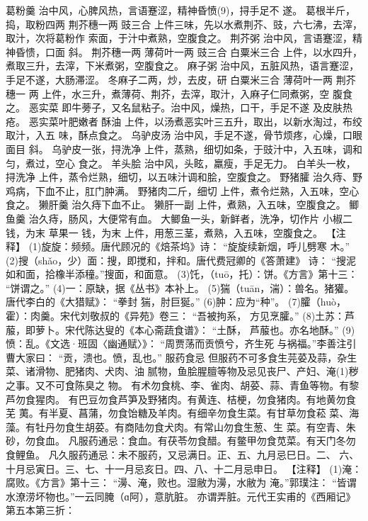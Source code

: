 \documentclass[12pt,UTF8]{ctexbook}
\begin{document}
葛粉羹 治中风，心脾风热，言语蹇涩，精神昏愤(9)，挦手足不
遂。
葛根半斤，捣，取粉四两 荆芥穗一两 豉三合
上件三味，先以水煮荆芥、豉，六七沸，去滓，取汁，次将葛粉作
索面，于汁中煮熟，空腹食之。
荆芥粥 治中风，言语蹇涩，精神昏愦，口面 斜。
荆芥穗一两 薄荷叶一两 豉三合 白粟米三合
上件，以水四升，煮取三升，去滓，下米煮粥，空腹食之。
麻子粥 治中风，五脏风热，语言蹇涩，手足不遂，大肠滞涩。
冬麻子二两，炒，去皮，研 白粟米三合 薄荷叶一两 荆芥穗一
两
上件，水三升，煮薄荷、荆芥，去滓，取汁，入麻子仁同煮粥，空
腹食之。
恶实菜 即牛蒡子，又名鼠粘子。治中风，燥热，口干，手足不遂
及皮肤热疮。
恶实菜叶肥嫩者 酥油
上件，以汤煮恶实叶三五升，取出，以新水淘过，布绞取汁，入五
味，酥点食之。
乌驴皮汤 治中风，手足不遂，骨节烦疼，心燥，口眼面目 斜。
乌驴皮一张，挦洗净
上件，蒸熟，细切如条，于豉汁中，入五味，调和匀，煮过，空心
食之。
羊头脍 治中风，头眩，羸瘦，手足无力。
白羊头一枚，挦洗净
上件，蒸令烂熟，细切，以五味汁调和脍，空腹食之。
野猪臛 治久痔、野鸡病，下血不止，肛门肿满。
野猪肉二斤，细切
上件，煮令烂熟，入五味，空心食之。
獭肝羹 治久痔下血不止。
獭肝一副
上件，煮熟，入五味，空腹食之。
鲫鱼羹 治久痔，肠风，大便常有血。
大鲫鱼一头，新鲜者，洗净，切作片 小椒二钱，为末 草果一
钱，为末
上件，用葱三茎，煮熟，入五味，空腹食之。
【注释】
(1)旋旋：频频。唐代顾况的《焙茶坞》诗：
“旋旋续新烟，呼儿劈寒
木。”
(2)搜（shǎo，少）面：搜，即搅和，拌和。唐代费冠卿的《答萧建》
诗：
“搜泥如和面，拾橡半添穜。”搜面，和面意。
(3)饦，（tuō，托）：饼。《方言》第十三：
“饼谓之。”
(4)一：原缺，据《丛书》本补上。
(5)猯（tuān，湍）：兽名。猪獾。唐代李白的《大猎赋》：
“拳封
猯，肘巨狿。”
(6)肿：应为“种”。
(7)臛（huò，霍）：肉羹。宋代刘敬叔的《异苑》卷三：
“吾被拘系，
方见烹臛。”
(8)土苏：芦菔，即萝卜。宋代陈达叟的《本心斋蔬食谱》：
“土酥，
芦菔也。亦名地酥。”
(9)愤：乱。《文选·班固〈幽通赋〉》：
“周贾荡而贡愤兮，齐生死
与祸福。”李善注引曹大家曰：
“贡，溃也。愤，乱也。”
服药食忌
但服药不可多食生芫荽及蒜，杂生菜、诸滑物、肥猪肉、犬肉、油
腻物，鱼脍腥膻等物及忌见丧尸、产妇、淹(1)秽之事。又不可食陈臭之
物。
有术勿食桃、李、雀肉、胡荽、蒜、青鱼等物。有黎芦勿食猩肉。
有巴豆勿食芦笋及野猪肉。有黄连、桔梗，勿食猪肉。有地黄勿食芜
荑。有半夏、菖蒲，勿食饴糖及羊肉。有细辛勿食生菜。有甘草勿食菘
菜、海藻。有牡丹勿食生胡荽。有商陆勿食犬肉。有常山勿食生葱、生
菜。有空青、朱砂，勿食血。
凡服药通忌：食血。有茯苓勿食醋。有鳖甲勿食苋菜。有天门冬勿
食鲤鱼。
凡久服药通忌：未不服药，又忌满日。正、五、九月忌巳日。二、
六、十月忌寅日。三、七、十一月忌亥日。四、八、十二月忌申日。
【注释】
(1)淹：腐败。《方言》第十三：
“澷、淹，败也。湿敝为澷，水敝为
淹。”郭璞注：
“皆谓水潦涝坏物也。”一云同腌（ɑ阿），意肮脏。
亦谓弄脏。元代王实甫的《西厢记》第五本第三折：
\end{document}
